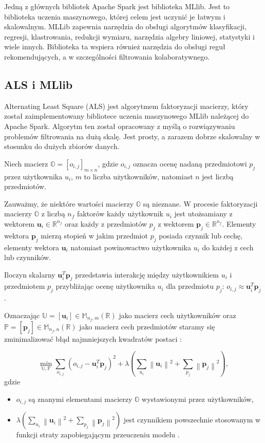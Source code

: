 \documentclass[12pt,a4paper]{report}
\newcommand{\setR}{\mathbb{R}}
\newcommand{\norm}[2][]{\left\| {#2} \right\|_{#1}}
\begin{document}
Jedną z głównych bibliotek Apache Spark jest biblioteka MLlib. Jest to biblioteka uczenia maszynowego, której celem jest uczynić je łatwym i skalowalnym. MLLib zapewnia narzędzia do obsługi algorytmów klasyfikacji, regresji, klastrowania, redukcji wymiaru, narzędzia algebry liniowej, statystyki i wiele innych. Biblioteka ta wspiera również narzędzia do obsługi reguł rekomendujących, a w szczególności filtrowania kolaboratywnego.

\subsection{ALS i MLlib}
Alternating Least Square (ALS) jest algorytmem faktoryzacji macierzy, który został zaimplementowany bibliotece uczenia maszynowego MLlib należącej do Apache Spark. Algorytm ten został opracowany z myślą o rozwiązywaniu problemów filtrowania na dużą skalę. Jest prosty, a zarazem dobrze skalowalny w stosunku do dużych zbiorów danych.

Niech macierz $\mathbb{O}=[o_{i,j}]_{m \times n}$, gdzie $o_{i,j}$ oznacza ocenę nadaną przedmiotowi $p_j$ przez użytkownika $u_i$, $m$ to liczba użytkowników, natomiast $n$ jest liczbą przedmiotów.

Zauważmy, że niektóre wartości macierzy $\mathbb{O}$ są nieznane. W procesie faktoryzacji macierzy $\mathbb{O}$ z liczbą $n_f$ faktorów każdy użytkownik $u_i$ jest utożsamiany z wektorem $\mathbf{u}_i \in \setR^{n_f}$ oraz każdy z przedmiotów $p_j$ z wektorem $\mathbf{p}_j \in \setR^{n_f}$. Elementy wektora $\mathbf{p}_j$ mierzą stopień w jakim przedmiot $p_j$ posiada czynnik lub cechę, elementy wektora $\mathbf{u}_i$ natomiast powinowactwo użytkownika $u_i$ do każdej z cech lub czynników.

Iloczyn skalarny $\mathbf{u}_i^T \mathbf{p}_j$ przedstawia interakcję między użytkownikiem $u_i$ i przedmiotem $p_j$ przybliżając ocenę użytkownika $u_i$ dla przedmiotu $p_j$: $o_{i,j} \approx \mathbf{u}_i^T \mathbf{p}_j$. 

Oznaczając $\mathbb{U}=[\mathbf{u}_i] \in \mathbb{M}_{n_f,m}(\setR)$ jako macierz cech użytkowników oraz $\mathbb{P}=[\mathbf{p}_j] \in \mathbb{M}_{n_f,n}(\setR)$ jako macierz cech przedmiotów staramy się zminimalizować błąd najmniejszych kwadratów postaci {\citep{mcvals}}:

$$
\min_{\mathbb{U}, \mathbb{P}} \sum_{o_{i,j}} (o_{i,j} - \mathbf{u}_i^T \mathbf{p}_j)^2 + \lambda (\sum_{u_i} \norm{\mathbf{u}_i}^2 + \sum_{p_j} \norm{\mathbf{p}_j}^2),
$$
gdzie 
\begin{itemize}
\item $o_{i,j}$ są znanymi elementami macierzy $\mathbb{O}$ wystawionymi przez użytkowników,
\item $\lambda (\sum_{u_i} \norm{\mathbf{u}_i}^2 + \sum_{p_j} \norm{\mathbf{p}_j}^2)$ jest czynnikiem powszechnie stosowanym w funkcji straty zapobiegającym przeuczeniu modelu .
\end{itemize}
\end{document}
